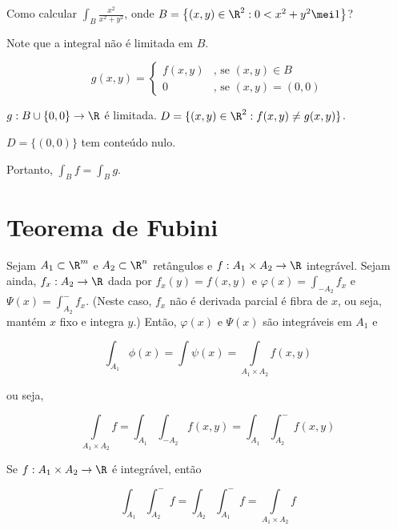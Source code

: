 \documentclass[11pt, oneside, a4paper]{gsm-l}
\begin{document}
\begin{exem}
Como calcular $\int_B {\frac{x^2}{x^2 + y^2}}$, onde $B = \left\{ (x,y) \in \R^2: 0 < x^2 + y^2 \mei 1 \right\}$?
\end{exem}

\begin{dem}
Note que a integral não é limitada em $B$.

\begin{equation*}
  g(x,y) =
  \begin{cases}
    f(x,y) 	& \mbox{, se } (x,y) \in B \\
    0 	& \mbox{, se } (x,y) = (0,0)
  \end{cases}
\end{equation*}

$g:B \cup \{ 0,0 \} \to \R$ é limitada. $D = \{ (x,y) \in \R^2: f(x,y) \ne g(x,y) \}$.

$D = \{(0,0)\}$ tem conte\'udo nulo.

Portanto, $\int_B f = \int_B g$.
\end{dem}


\section{Teorema de Fubini}\label{sec28}

\begin{teo}[Fubini]
\begin{sloppypar}
Sejam $A_1 \subset \R^m$ e $A_2 \subset \R^n$ ret\^angulos e ${f:A_1 \times A_2 \to \R}$ integrável. Sejam ainda, $f_x: A_2 \to \R$ dada por $f_x(y) = f(x,y)$ e $\varphi(x) = \int_{-A_2} f_x$ e $\Psi(x) = \int_{A_2}^{-} f_x$. (Neste caso, $f_x$ não é derivada parcial é fibra de $x$, ou seja, mantém $x$ fixo e integra $y$.) Então, $\varphi(x)$ e $\Psi(x)$ são integráveis em $A_1$ e
\end{sloppypar}

\[
\int_{A_1 } {\phi (x)}  = \int {\psi (x)}  = \int\limits_{A_1  \times A_2 } {f(x,y)} 
\]

ou seja,

\[
\int\limits_{A_1  \times A_2 } f  = \int_{A_1 } {\int_{ - A_2 } {f(x,y)} }  = \int_{A_1 } {\int_{A_2 }^ -  {f(x,y)} } 
\]
\end{teo}

\begin{cor}
Se $f:A_1 \times A_2 \to \R$ é integrável, então

\[
\int_{A_1 } {\int_{A_2 }^ -  f }  = \int_{A_2 } {\int_{A_1 }^ -  f }  = \int\limits_{A_1  \times A_2 } f
\]
\end{cor}
\end{document}
